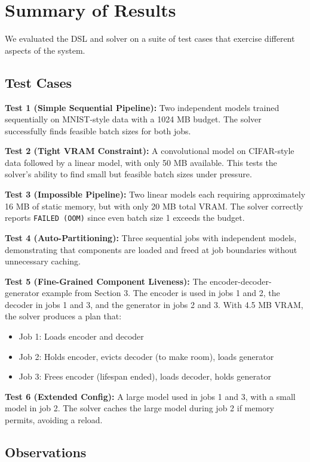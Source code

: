 \documentclass{nfr}
\begin{document}
\section{Summary of Results}

We evaluated the DSL and solver on a suite of test cases that exercise different aspects of the system.

\subsection{Test Cases}

\textbf{Test 1 (Simple Sequential Pipeline):} Two independent models trained sequentially on MNIST-style data with a 1024 MB budget. The solver successfully finds feasible batch sizes for both jobs.

\textbf{Test 2 (Tight VRAM Constraint):} A convolutional model on CIFAR-style data followed by a linear model, with only 50 MB available. This tests the solver's ability to find small but feasible batch sizes under pressure.

\textbf{Test 3 (Impossible Pipeline):} Two linear models each requiring approximately 16 MB of static memory, but with only 20 MB total VRAM. The solver correctly reports \texttt{FAILED (OOM)} since even batch size 1 exceeds the budget.

\textbf{Test 4 (Auto-Partitioning):} Three sequential jobs with independent models, demonstrating that components are loaded and freed at job boundaries without unnecessary caching.

\textbf{Test 5 (Fine-Grained Component Liveness):} The encoder-decoder-generator example from Section 3. The encoder is used in jobs 1 and 2, the decoder in jobs 1 and 3, and the generator in jobs 2 and 3. With 4.5 MB VRAM, the solver produces a plan that:
\begin{itemize}
    \item Job 1: Loads encoder and decoder
    \item Job 2: Holds encoder, evicts decoder (to make room), loads generator
    \item Job 3: Frees encoder (lifespan ended), loads decoder, holds generator
\end{itemize}

\textbf{Test 6 (Extended Config):} A large model used in jobs 1 and 3, with a small model in job 2. The solver caches the large model during job 2 if memory permits, avoiding a reload.

\subsection{Observations}
\end{document}
